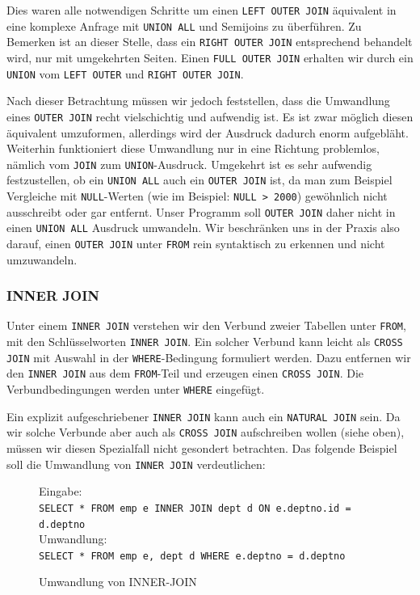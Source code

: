 Dies waren alle notwendigen Schritte um einen \verb|LEFT OUTER JOIN| äquivalent in eine komplexe Anfrage mit \verb|UNION ALL| und Semijoins zu überführen. Zu Bemerken ist an dieser Stelle, dass ein \verb|RIGHT OUTER JOIN| entsprechend behandelt wird, nur mit umgekehrten Seiten. Einen \verb|FULL OUTER JOIN| erhalten wir durch ein \verb|UNION| vom \verb|LEFT OUTER| und \verb|RIGHT OUTER JOIN|. 

Nach dieser Betrachtung müssen wir jedoch feststellen, dass die Umwandlung eines \verb|OUTER JOIN| recht vielschichtig und aufwendig ist. Es ist zwar möglich diesen äquivalent umzuformen, allerdings wird der Ausdruck dadurch enorm aufgebläht. Weiterhin funktioniert diese Umwandlung nur in eine Richtung problemlos, nämlich vom \verb|JOIN| zum \verb|UNION|-Ausdruck. Umgekehrt ist es sehr aufwendig festzustellen, ob ein \verb|UNION ALL| auch ein \verb|OUTER JOIN| ist, da man zum Beispiel Vergleiche mit \verb|NULL|-Werten (wie im Beispiel: \verb|NULL > 2000|) gewöhnlich nicht ausschreibt oder gar entfernt. Unser Programm soll \verb|OUTER JOIN| daher nicht in einen \verb|UNION ALL| Ausdruck umwandeln. Wir beschränken uns in der Praxis also darauf, einen \verb|OUTER JOIN| unter \verb|FROM| rein syntaktisch zu erkennen und nicht umzuwandeln.

\subsubsection*{INNER JOIN}

Unter einem \verb|INNER JOIN| verstehen wir den Verbund zweier Tabellen unter \verb|FROM|, mit den Schlüsselworten \verb|INNER JOIN|. Ein solcher Verbund kann leicht als \verb|CROSS JOIN| mit Auswahl in der \verb|WHERE|-Bedingung formuliert werden. Dazu entfernen wir den \verb|INNER JOIN| aus dem \verb|FROM|-Teil und erzeugen einen \verb|CROSS JOIN|. Die Verbundbedingungen werden unter \verb|WHERE| eingefügt.

Ein explizit aufgeschriebener \verb|INNER JOIN| kann auch ein \verb|NATURAL JOIN| sein. Da wir solche Verbunde aber auch als \verb|CROSS JOIN| aufschreiben wollen (siehe oben), müssen wir diesen Spezialfall nicht gesondert betrachten. Das folgende Beispiel soll die Umwandlung von \verb|INNER JOIN| verdeutlichen:

\begin{figure}[h]
Eingabe:\\
\verb|SELECT * FROM emp e INNER JOIN dept d ON e.deptno.id = d.deptno|\\

Umwandlung:\\
\verb|SELECT * FROM emp e, dept d WHERE e.deptno = d.deptno|\\
\caption{Umwandlung von INNER-JOIN}
\end{figure}


